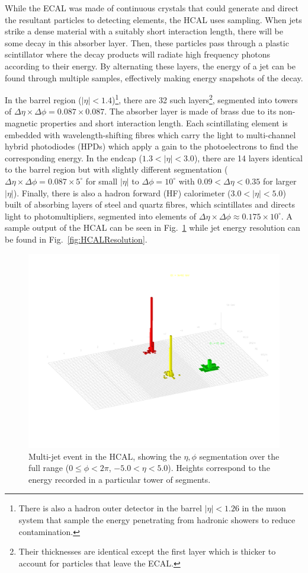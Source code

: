 While the ECAL was made of continuous crystals that could generate and direct the resultant particles to detecting elements, the HCAL uses sampling. When jets strike a dense material with a suitably short interaction length, there will be some decay in this absorber layer. Then, these particles pass through a plastic scintillator where the decay products will radiate high frequency photons according to their energy. By alternating these layers, the energy of a jet can be found through multiple samples, effectively making energy snapshots of the decay.

In the barrel region ($|\eta|<1.4$)\footnote{There is also a hadron outer detector in the barrel $|\eta|<1.26$ in the muon system that sample the energy penetrating from hadronic showers to reduce contamination.}, there are 32 such layers\footnote{Their thicknesses are identical except the first layer which is thicker to account for particles that leave the ECAL.}, segmented into towers of $\Delta\eta\times\Delta\phi = 0.087\times0.087$. The absorber layer is made of brass due to its non-magnetic properties and short interaction length. Each scintillating element is embedded with wavelength-shifting fibres which carry the light to multi-channel hybrid photodiodes (HPDs) which apply a gain to the photoelectrons to find the corresponding energy. In the endcap ($1.3<|\eta|<3.0$), there are 14 layers identical to the barrel region but with slightly different segmentation ($\Delta\eta\times\Delta\phi = 0.087\times5^{\circ}$ for small $|\eta|$ to $\Delta\phi=10^{\circ}$ with $0.09<\Delta\eta<0.35$ for larger $|\eta|$). Finally, there is also a hadron forward (HF) calorimeter ($3.0<|\eta|<5.0$) built of absorbing layers of steel and quartz fibres, which scintillates and directs light to photomultipliers, segmented into elements of $\Delta\eta\times\Delta\phi \approx 0.175\times10^{\circ}$. A sample output of the HCAL can be seen in Fig.~\ref{fig:HCALOutput} while jet energy resolution can be found in Fig.~\ref{fig:HCALResolution}.

\begin{figure}[htbp]
\begin{center}
\includegraphics[width=.7\linewidth]{Experiment/figures/HCALOutput.pdf}
\caption[Sample Output of the Hadronic Calorimeter]{Multi-jet event in the HCAL, showing the $\eta,\phi$ segmentation over the full range ($0\leq\phi<2\pi$, $-5.0<\eta<5.0$). Heights correspond to the energy recorded in a particular tower of segments.}
\label{fig:HCALOutput}
\end{center}
\end{figure}


